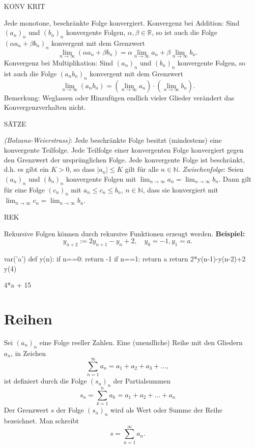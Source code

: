 \documentclass[fontsize=12pt,paper=a4,twoside,bibtotoc,idxtotoc,
liststotoc,pagesize,BCOR1.2cm,DIV15,chapterprefix,pagesize=pdftex]{scrbook}
\theoremstyle{plain}
\theoremstyle{definition}
\theoremstyle{remark}
\begin{document}
KONV KRIT


 Jede monotone, beschränkte Folge konvergiert.
 Konvergenz bei Addition: Sind $(a_n)_n$ und $(b_n)_n$ konvergente Folgen, $\alpha, \beta \in \mathbb{R}$, so ist auch die
                   Folge $( \alpha a_n+\beta b_n)_n$ konvergent mit
                   dem Grenzwert
 \[ \lim_{n \rightarrow \infty} ( \alpha a_n + \beta b_n)= \alpha
                   \lim_{n \rightarrow \infty} a_n + \beta \lim_{n
                   \rightarrow \infty} b_n .\]
 Konvergenz bei Multiplikation: Sind $(a_n)_n$ und $(b_n)_n$ konvergente Folgen, so ist auch die
                   Folge $(a_n b_n)_n$ konvergent mit
                   dem Grenzwert
 \[
  \lim_{n \rightarrow \infty} ( a_n b_n)= 
                   (\lim_{n \rightarrow \infty} a_n) \cdot  (\lim_{n
                   \rightarrow \infty} b_n).
 \]
 Bemerkung: Weglassen oder Hinzufügen endlich vieler Glieder verändert das
                   Konvergenzverhalten nicht.


SÄTZE


 \emph{(Bolzano-Weierstrass)}: Jede beschränkte Folge besitzt (mindestens) eine
konvergente Teilfolge.
 Jede Teilfolge einer konvergenten Folge konvergiert gegen den
Grenzwert der ursprünglichen Folge.
 Jede konvergente Folge ist beschränkt, d.h. es gibt ein $K>0$,
so dass $|a_n|\leq K$ gilt für alle $n \in \mathbb{N}$.
 \emph{Zwischenfolge}: Seien $(a_n)_n$ und $(b_n)_n$ konvergente Folgen mit $\lim_{n
\rightarrow \infty} a_n = \lim_{n \rightarrow \infty} b_n$. Dann gilt
für eine Folge $(c_n)_n$ mit $a_n \leq c_n \leq b_n$, $n \in
\mathbb{N}$, dass sie konvergiert mit  $\lim_{n
\rightarrow \infty} c_n = \lim_{n \rightarrow \infty} b_n$.


REK

Rekursive Folgen können durch rekursive Funktionen erzeugt werden.
\textbf{Beispiel:}
\[ y_{n+2}:=2y_{n+1}-y_n+2, \quad y_0=-1, y_1=a. \]
\begin{sagein}
var('a')
def y(n):
   if n==0:
       return -1
   if n==1:
       return a
   return 2*y(n-1)-y(n-2)+2
y(4)
\end{sagein}
\begin{sage}
4*a + 15
\end{sage}

\section{Reihen}
Sei $(a_n)_n$ eine Folge reeller Zahlen. Eine {\color{red} (unendliche)
Reihe} mit den {\color{red} Gliedern} $a_n$, in Zeichen
\[ \sum_{n=1}^\infty a_n =a_1 + a_2 + a_3 + \dots, \]
ist definiert durch die Folge $(s_n)_n$ der {\color{red} Partialsummen}\\
\[
s_n=\sum_{k=1}^n a_k = a_1+a_2+ \dots +a_n 
\]
Der Grenzwert $s$ der Folge $(s_n)_n$ wird als {\color{red} Wert} oder 
{\color{red} Summe} der Reihe bezeichnet. Man schreibt
\[s= \sum_{n=1}^\infty a_n.\] 
\end{document}
